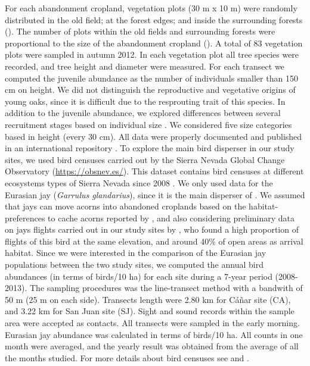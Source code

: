 For each abandonment cropland, vegetation plots (30 m x 10 m) were randomly distributed in the old field; at the forest edges; and inside the surrounding forests (). The number of plots within the old fields and surrounding forests were proportional to the size of the abandonment cropland (). A total of 83 vegetation plots were sampled in autumn 2012. In each vegetation plot all tree species were recorded, and tree height and diameter were measured. For each transect we computed the juvenile abundance as the number of individuals smaller than 150 cm on height. We did not distinguish the reproductive and vegetative origins of young oaks, since it is difficult due to the resprouting trait of this species. In addition to the juvenile abundance, we explored differences between several recruitment stages based on individual size \autocites[\emph{e.g}][]{Plieningeretal2010LargeScalePatterns}. We considered five size categories based in height (every 30 cm). All data were properly documented and published in an international repository \autocites[see][for a detailed description of the dataset]{PerezLuqueetal2015DatasetMIGRAME}. 
To explore the main bird disperser in our study sites, we used bird censuses carried out by the Sierra Nevada Global Change Observatory (\href{https://obsnev.es/}{https://obsnev.es/}). This dataset contains bird censuses at different ecosystems types of Sierra Nevada since 2008 \autocites[for more details see][]{BareaAzconetal2012PasseriformesOtras, PerezLuqueetal2016DatasetPasserine}. We only used data for the Eurasian jay (\emph{Garrulus glandarius}), since it is the main disperser of \Qpy \autocites{Gomez2003SpatialPatterns}. We assumed that jays can move acorns into abandoned croplands based on the habitat-preferences to cache acorns reported by \citet{PonsPausas2007AcornDispersal}, and also considering preliminary data on jays flights carried out in our study sites by \citet{Zamoraetal2013CambioGlobal}, who found a high proportion of flights of this bird at the same elevation, and around 40\% of open areas as arrival habitat. Since we were interested in the comparison of the Eurasian jay populations between the two study sites, we computed the annual bird abundances (in terms of birds/10 ha) for each site during a 7-year period (2008-2013). The sampling procedures was the line-transect method with a bandwith of 50 m (25 m on each side). Transects length were 2.80 km for Cáñar site (CA), and 3.22 km for San Juan site (SJ). Sight and sound records within the sample area were accepted as contacts. All transects were sampled in the early morning. Eurasian jay abundance was calculated in terms of birds/10 ha. All counts in one month were averaged, and the yearly result was obtained from the average of all the months studied. For more details about bird censuses see \citet{BareaAzconetal2012PasseriformesOtras} and \citet{ZamoraBareaAzcon2015LongTermChanges}.



